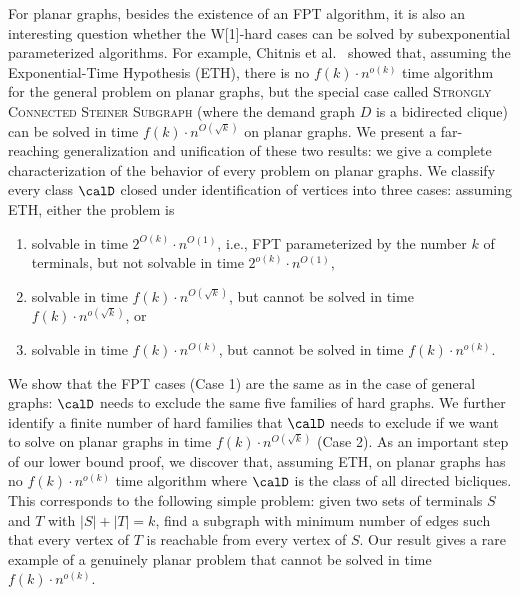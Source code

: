 For planar graphs, besides the existence of an FPT algorithm, it is also an interesting question whether the W[1]-hard cases can be solved by subexponential parameterized algorithms. 
For example, Chitnis et al.~\cite{ChitnisFHM20} showed that, assuming the Exponential-Time Hypothesis (ETH), there is no $f(k) \cdot n^{o(k)}$ time algorithm 
for the general \Dsngenfull problem on planar graphs, but the special case called \textsc{Strongly Connected Steiner Subgraph} 
(where the demand graph $D$ is a bidirected clique) can be solved in time $f(k) \cdot n^{O(\sqrt{k})}$ on planar graphs.
 We present a far-reaching generalization and unification of these two results: we give a complete characterization of the behavior of every \Dsngen problem on planar graphs. We classify every class $\calD$ closed under identification of vertices into three cases: assuming ETH, either the problem is
\begin{enumerate}
\item solvable in time $2^{O(k)} \cdot n^{O(1)}$, i.e., FPT parameterized by the number $k$ of terminals, but not solvable in time $2^{o(k)} \cdot n^{O(1)}$,
\item solvable in time $f(k) \cdot n^{O(\sqrt{k})}$, but cannot be solved in time $f(k) \cdot n^{o(\sqrt{k})}$, or
\item solvable in time $f(k) \cdot n^{O(k)}$, but cannot be solved in time $f(k) \cdot n^{o({k})}$.
  \end{enumerate}
  We show that the FPT cases (Case 1) are the same as in the case of general graphs: $\calD$ needs to exclude the same five families of hard graphs. We further identify a finite number of hard families that $\calD$ needs to exclude if we want to solve \Dsngen on planar graphs in time $f(k) \cdot n^{O(\sqrt{k})}$ (Case 2). As an important step of our lower bound proof, we discover that, assuming ETH, \Dsngen on planar graphs has no $f(k) \cdot n^{o(k)}$ time algorithm where $\calD$ is the class of all directed bicliques. This corresponds to the following simple problem: given two sets of terminals $S$ and $T$ with $|S|+|T|=k$, find a subgraph with minimum number of edges such that every vertex of $T$ is reachable from every vertex of $S$. Our result gives a rare example of a genuinely planar problem that cannot be solved in time $f(k) \cdot n^{o(k)}$.
  
